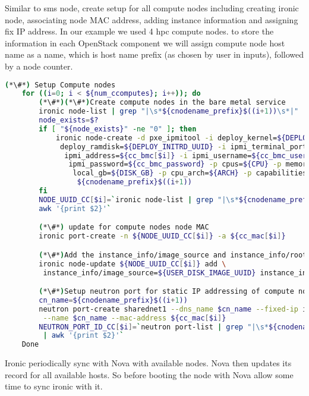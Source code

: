 Similar to sms node, create setup for all compute nodes including creating ironic node, associating node MAC address, adding instance information and assigning fix IP address. In our example we used 4 hpc compute nodes. to store the information in each OpenStack component we will assign compute node host name as a name, which is host name prefix (as chosen by user in inputs), followed by a node counter. 

\begin{lstlisting}[language=bash,keywords={}]
(*\#*) Setup Compute nodes
    for ((i=0; i < ${num_ccomputes}; i++)); do
        (*\#*)(*\#*)Create compute nodes in the bare metal service
        ironic node-list | grep "|\s*${cnodename_prefix}$((i+1))\s*|"
        node_exists=$?
        if [ "${node_exists}" -ne "0" ]; then
            ironic node-create -d pxe_ipmitool -i deploy_kernel=${DEPLOY_VMLINUZ_UUID} -i \
             deploy_ramdisk=${DEPLOY_INITRD_UUID} -i ipmi_terminal_port=8023 -i \
              ipmi_address=${cc_bmc[$i]} -i ipmi_username=${cc_bmc_username} -i \
               ipmi_password=${cc_bmc_password} -p cpus=${CPU} -p memory_mb=${RAM_MB} -p \
                local_gb=${DISK_GB} -p cpu_arch=${ARCH} -p capabilities="boot_mode:bios" -n \
                 ${cnodename_prefix}$((i+1))
        fi
        NODE_UUID_CC[$i]=`ironic node-list | grep "|\s*${cnodename_prefix}$((i+1))\s*|" | \
        awk '{print $2}'`

        (*\#*) update for compute nodes node MAC
        ironic port-create -n ${NODE_UUID_CC[$i]} -a ${cc_mac[$i]}

        (*\#*)Add the instance_info/image_source and instance_info/root_gb
        ironic node-update ${NODE_UUID_CC[$i]} add \
         instance_info/image_source=${USER_DISK_IMAGE_UUID} instance_info/root_gb=50

        (*\#*)Setup neutron port for static IP addressing of compute nodes
        cn_name=${cnodename_prefix}$((i+1))
        neutron port-create sharednet1 --dns_name $cn_name --fixed-ip ip_address=${cc_ip[$i]} \
         --name $cn_name --mac-address ${cc_mac[$i]}
        NEUTRON_PORT_ID_CC[$i]=`neutron port-list | grep "|\s*${cnodename_prefix}$((i+1))\s*|" \
         | awk '{print $2}'`
    Done
\end{lstlisting}


 Ironic periodically sync with Nova with available nodes. Nova then updates its record for all available hosts. So before booting the node with Nova allow some time to sync ironic with it. 



